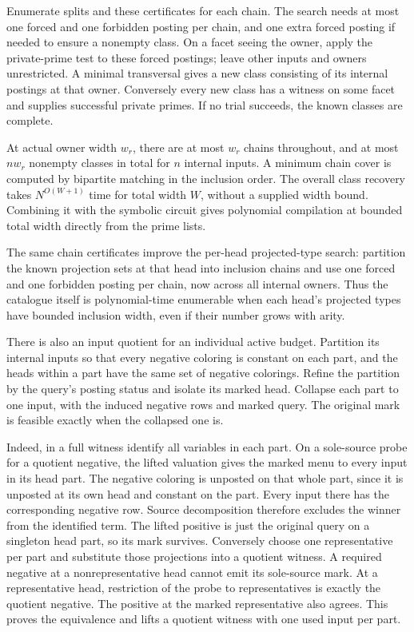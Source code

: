 Enumerate splits and these certificates
for each chain. The search needs at most
one forced and one forbidden posting per
chain, and one extra forced posting if
needed to ensure a nonempty class.
On a facet seeing the owner, apply the
private-prime test to these forced
postings; leave other inputs and owners
unrestricted. A minimal transversal
gives a new class consisting of its
internal postings at that owner.
Conversely every new class has a
witness on some facet and supplies
successful private primes. If no trial
succeeds, the known classes are complete.

At actual owner width $w_r$, there are
at most $w_r$ chains throughout, and at
most $n w_r$ nonempty classes in total
for $n$ internal inputs. A minimum chain
cover is computed by bipartite matching
in the inclusion order. The overall
class recovery takes $N^{O(W+1)}$ time
for total width $W$, without a supplied
width bound. Combining it with the
symbolic circuit gives polynomial
compilation at bounded total width
directly from the prime lists.

The same chain certificates improve
the per-head projected-type search:
partition the known projection sets
at that head into inclusion chains
and use one forced and one forbidden
posting per chain, now across all
internal owners. Thus the catalogue
itself is polynomial-time enumerable
when each head's projected types have
bounded inclusion width, even if their
number grows with arity.

There is also an input quotient for an
individual active budget. Partition its
internal inputs so that every negative
coloring is constant on each part, and
the heads within a part have the same set
of negative colorings. Refine the partition
by the query's posting status and isolate
its marked head. Collapse each part to
one input, with the induced negative rows
and marked query. The original mark is
feasible exactly when the collapsed one is.

Indeed, in a full witness identify all
variables in each part. On a sole-source
probe for a quotient negative, the lifted
valuation gives the marked menu to every
input in its head part. The negative
coloring is unposted on that whole part,
since it is unposted at its own head
and constant on the part. Every input
there has the corresponding negative row.
Source decomposition therefore excludes
the winner from the identified term.
The lifted positive is just the original
query on a singleton head part, so its
mark survives. Conversely choose one
representative per part and substitute
those projections into a quotient witness.
A required negative at a nonrepresentative
head cannot emit its sole-source mark.
At a representative head, restriction of
the probe to representatives is exactly
the quotient negative. The positive
at the marked representative also agrees.
This proves the equivalence and lifts
a quotient witness with one used input
per part.

